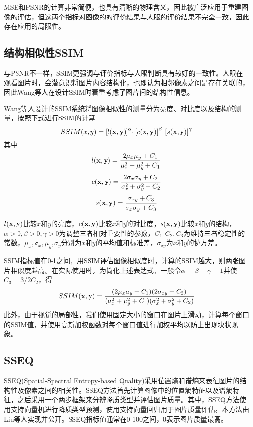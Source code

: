 \documentclass[a4paper, 12pt, oneside]{report}
\begin{document}
{MSE和PSNR的计算非常简便，也具有清晰的物理含义，因此被广泛应用于重建图像的评估，但这两个指标对图像的的评价结果与人眼的评价结果不完全一致，因此存在应用的局限性。

\subsection{结构相似性SSIM\quad}
与PSNR不一样，SSIM更强调与评价指标与人眼判断具有较好的一致性。人眼在观看图片时，会潜意识将图片内容结构化，也即认为相邻像素之间是存在关联的，因此Wang\cite{ref24}等人在设计SSIM时着重考虑了图片间的结构性信息。
	
Wang等人设计的SSIM系统将图像相似性的测量分为亮度、对比度以及结构的测量，按照下式进行SSIM的计算
\begin{equation}
SSIM(x, y) = {[l{\bf (x, y)}]}^{\alpha}\cdotp {[c{\bf (x, y)}]}^{\beta}\cdotp {[s{\bf (x, y)}]}^{\gamma} 
\end{equation}
其中
\begin{equation}
l{\bf (x, y)} = \frac{2\mu_x\mu_y + C_1}{\mu_x^2 + \mu_y^2 + C_1}
\end{equation}
\begin{equation}
c{\bf (x, y)} = \frac{2\sigma_x\sigma_y + C_2}{\sigma_x^2 + \sigma_y^2 + C_2}
\end{equation}
\begin{equation}
s{\bf (x, y)} = \frac{\sigma_{xy}+ C_3}{\sigma_x\sigma_y + C_3}
\end{equation}

$l{\bf (x, y)}$比较$x$和$y$的亮度，$c{\bf (x, y)}$比较$x$和$y$的对比度，$s{\bf (x, y)}$比较$x$和$y$的结构，$\alpha > 0, \beta > 0, \gamma > 0$为调整三者相对重要性的参数，$C_1, C_2, C_3$为维持三者稳定性的常数，$\mu_x, \sigma_x, \mu_y, \sigma_y$分别为$x$和$y$的平均值和标准差，$\sigma_{xy}$为$x$和$y$的协方差。

SSIM指标值在0-1之间，用SSIM评估图像相似度时，计算的SSIM越大，则两张图片相似度越高。在实际使用时，为简化上述表达式，一般令$\alpha = \beta = \gamma = 1$并使$C_3 = 3/2 C_2$，得
\begin{equation}
SSIM({\bf x, y}) = \frac{(2\mu_x\mu_y + C_1)(2\sigma_{xy}+ C_2)}{(\mu_x^2 + \mu_y^2 + C_1)(\sigma_x^2 + \sigma_y^2 + C_2)}
\end{equation}
此外，由于视觉的局部性，我们使用固定大小的窗口在图片上滑动，计算每个窗口的SSIM值，并使用高斯加权函数对每个窗口值进行加权平均以防止出现块状现象。

\subsection{SSEQ\quad}
SSEQ\cite{ref25}(Spatial-Spectral Entropy-based Quality)采用位置熵和谱熵来表征图片的结构性及像素之间的相关性。SSEQ方法首先计算图像中的位置熵特征以及谱熵特征，之后采用一个两步框架来分辨降质类型并评估图片质量。其中，SSEQ方法使用支持向量机进行降质类型预测，使用支持向量回归用于图片质量评估。本方法由Liu等人实现并公开。SSEQ指标值通常在0-100之间，0表示图片质量最高。

}
\end{document}
